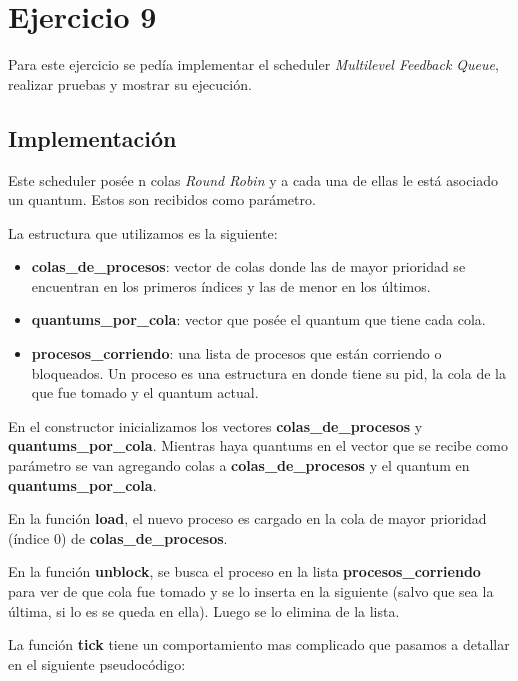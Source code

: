 \section{Ejercicio 9}

Para este ejercicio se pedía implementar el scheduler \textit{Multilevel Feedback Queue}, realizar pruebas y mostrar su ejecución.

\subsection{Implementación}

Este scheduler posée n colas \emph{Round Robin} y a cada una de ellas le está asociado un quantum. Estos son recibidos como parámetro.

La estructura que utilizamos es la siguiente:

\begin{itemize}

\item \textbf{colas\_de\_procesos}: vector de colas donde las de mayor prioridad se encuentran en los primeros índices y las de menor en los últimos.

\item \textbf{quantums\_por\_cola}: vector que posée el quantum que tiene cada cola.

\item \textbf{procesos\_corriendo}: una lista de procesos que están corriendo o bloqueados. Un proceso es una estructura en donde tiene su pid, la cola de la que fue tomado y el quantum actual.

\end{itemize}

En el constructor inicializamos los vectores \textbf{colas\_de\_procesos} y \textbf{quantums\_por\_cola}. Mientras haya quantums en el vector que se recibe como parámetro se van agregando colas a \textbf{colas\_de\_procesos} y el quantum en \textbf{quantums\_por\_cola}.

En la función \textbf{load}, el nuevo proceso es cargado en la cola de mayor prioridad (índice 0) de \textbf{colas\_de\_procesos}.

En la función \textbf{unblock}, se busca el proceso en la lista \textbf{procesos\_corriendo} para ver de que cola fue tomado y se lo inserta en la siguiente (salvo que sea la última, si lo es se queda en ella). Luego se lo elimina de la lista.

La función \textbf{tick} tiene un comportamiento mas complicado que pasamos a detallar en el siguiente pseudocódigo:

